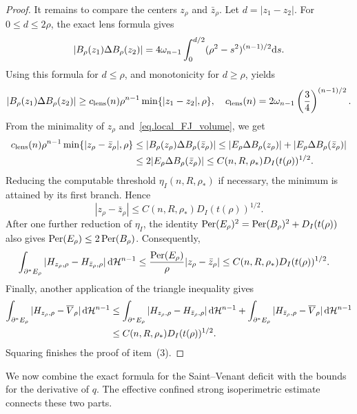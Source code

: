 \documentclass[11pt]{amsart}
\theoremstyle{plain}
\theoremstyle{definition}
\newcommand{\dHn}{\,\dd\mathcal{H}^{n-1}}
\def\dd{{\rm d}}
\newcommand\Per{\mathop{\rm Per}}
\begin{document}
\begin{proof}
It remains to compare the centers $z_\rho$ and $\bar z_\rho$. Let
$d=|z_1-z_2|$. For $0\le d\le2\rho$, the exact lens formula gives
\[
 |B_\rho(z_1)\Delta B_\rho(z_2)|
 =4\omega_{n-1}\int_0^{d/2}(\rho^2-s^2)^{(n-1)/2}\dd s.
\]
Using this formula for $d\le\rho$, and monotonicity for $d\ge\rho$, yields
\begin{equation}\label{eq.lens_lower_bound}
 |B_\rho(z_1)\Delta B_\rho(z_2)|
 \ge c_{\rm lens}(n)\rho^{n-1}\min\{|z_1-z_2|,\rho\},
 \quad
 c_{\rm lens}(n)=2\omega_{n-1}\left(\frac34\right)^{(n-1)/2}.
\end{equation}
From the minimality of $z_\rho$ and~\eqref{eq.local_FJ_volume}, we get
\begin{align*}
 c_{\rm lens}(n)\rho^{n-1}
 \min\{|z_\rho-\bar z_\rho|,\rho\}
 &\le|B_\rho(z_\rho)\Delta B_\rho(\bar z_\rho)| 
 \le|E_\rho\Delta B_\rho(z_\rho)|
 +|E_\rho\Delta B_\rho(\bar z_\rho)|\\
 &\le2|E_\rho\Delta B_\rho(\bar z_\rho)| 
 \le C(n,R,\rho_*)D_I(t(\rho))^{1/2}.
\end{align*}
Reducing the computable threshold $\eta_I(n,R,\rho_*)$ if necessary, the
minimum is attained by its first branch. Hence
\[
 |z_\rho-\bar z_\rho|
 \le C(n,R,\rho_*)D_I(t(\rho))^{1/2}.
\]
After one further reduction of $\eta_I$, the identity
$\Per(E_\rho)^2=\Per(B_\rho)^2+D_I(t(\rho))$ also gives
$\Per(E_\rho)\le2\Per(B_\rho)$. Consequently,
\begin{align*}
 \int_{\partial^*E_\rho}
 |H_{z_\rho,\rho}-H_{\bar z_\rho,\rho}|\dHn
 &\le\frac{\Per(E_\rho)}{\rho}|z_\rho-\bar z_\rho| \le C(n,R,\rho_*)D_I(t(\rho))^{1/2}.
\end{align*}
Finally, another application of the triangle inequality gives
\begin{align*}
 \int_{\partial^*E_\rho}|H_{z_\rho,\rho}-\overline V_\rho|\dHn
 &\le\int_{\partial^*E_\rho}|H_{z_\rho,\rho}-H_{\bar z_\rho,\rho}|\dHn 
 +
 \int_{\partial^*E_\rho}|H_{\bar z_\rho,\rho}-\overline V_\rho|\dHn\\
 &\le C(n,R,\rho_*)D_I(t(\rho))^{1/2}.
\end{align*}
Squaring finishes the proof of item~(3).
\end{proof}


We now combine the exact formula for the Saint--Venant deficit with the bounds for the derivative of  $q$. The effective confined strong isoperimetric estimate connects these two parts.
\end{document}
